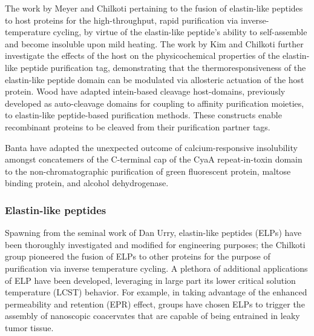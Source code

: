 \begin{refsection}
The work by Meyer and Chilkoti pertaining to the fusion of elastin-like peptides
to host proteins for the high-throughput, rapid purification via
inverse-temperature cycling, by virtue of the elastin-like peptide's ability to
self-assemble and become insoluble upon mild heating.\cite{Meyer1999,Meyer2001}
The work by Kim and Chilkoti further investigate the effects of the host on the
physicochemical properties of the elastin-like peptide purification tag,
demonstrating that the thermoresponsiveness of the elastin-like peptide domain
can be modulated via allosteric actuation of the host protein.\cite{Kim2008a}
Wood  have adapted intein-based cleavage host-domains, previously
developed as auto-cleavage domains for coupling to affinity purification
moieties,\cite{Wood1999} to elastin-like peptide-based purification
methods.\cite{Banki2005} These constructs enable recombinant proteins to be
cleaved from their purification partner tags.

Banta  have adapted the unexpected
outcome of calcium-responsive insolubility amongst concatemers of the C-terminal
cap of the CyaA repeat-in-toxin domain to the non-chromatographic purification
of green fluorescent protein, maltose binding protein, and alcohol
dehydrogenase.\cite{Shur2013}

\subsubsection{Elastin-like peptides}

Spawning from the seminal work of Dan Urry, elastin-like peptides (ELPs) have
been thoroughly investigated and modified for engineering purposes; the Chilkoti
group pioneered the fusion of ELPs to other proteins for the purpose of
purification via inverse temperature cycling.\cite{Meyer1999} A plethora of
additional applications of ELP have been developed, leveraging in large part its
lower critical solution temperature (LCST) behavior.\cite{Urry2002} For example,
in taking advantage of the enhanced permeability and retention (EPR) effect,
groups have chosen ELPs to trigger the assembly of nanoscopic coacervates
 that are capable of being entrained in leaky tumor
tissue.\cite{Nakayama2010,DeLasHerasAlarcon2005} 


\end{refsection}
